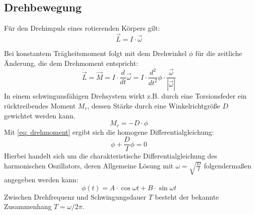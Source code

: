 \subsection{Drehbewegung}
Für den Drehimpuls eines rotierenden Körpers gilt:
\begin{equation}
 \vec{L} = I \cdot \vec{\omega}
\end{equation}

Bei konstantem Trägheitsmoment folgt mit dem Drehwinkel $\phi$ für die zeitliche Änderung, die dem Drehmoment
entspricht:
\begin{equation}
  \dot{\vec{L}} = \vec{M} = I \cdot \frac{d}{dt}\vec{\omega} =
  I \cdot \frac{d^2}{dt^2} \phi \cdot \frac{\vec{\omega}}{|\vec{\omega}|}
  \label{eq: drehmoment}
\end{equation}
In einem schwingunsfähigen Drehsystem wirkt z.B. durch eine Torsionsfeder ein
rücktreibendes Moment $M_{r}$, dessen Stärke durch eine Winkelrichtgröße $D$ gewichtet
werden kann.
\begin{equation}
  M_{r} = - D \cdot \phi
\end{equation}
Mit \eqref{eq: drehmoment} ergibt sich die homogene Differentialgleichung:
\begin{equation}
  \ddot{\phi} + \frac{D}{I}\phi = 0
\end{equation}
Hierbei handelt sich um die charakteristische Differentialgleichung des harmonischen
Oszillators, deren Allgemeine Lösung mit $\omega = \sqrt{\frac{D}{I}}$ folgendermaßen angegeben werden kann:
\begin{equation}
  \phi(t) = A\cdot \cos{\omega t} + B \cdot \sin{\omega t}
\end{equation}
Zwischen Drehfrequenz und Schwingungsdauer $T$ besteht der bekannte Zusammenhang
$T =\omega / 2\pi$. \\
